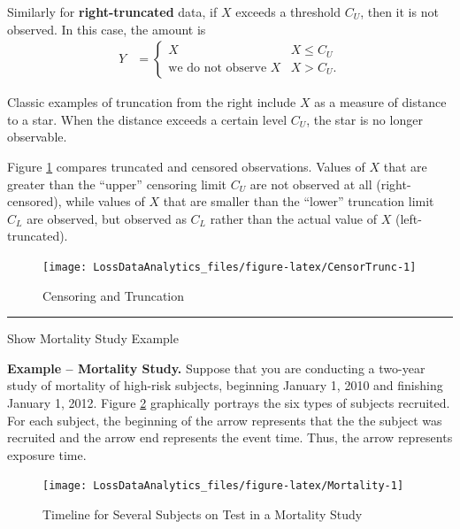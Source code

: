 \documentclass[]{book}
\theoremstyle{definition}
\theoremstyle{definition}
\theoremstyle{definition}
\theoremstyle{remark}
\begin{document}
Similarly for \textbf{right-truncated} data, if \(X\) exceeds a
threshold \(C_U\), then it is not observed. In this case, the amount is
\[
\begin{aligned}
Y &=
\left\{
\begin{array}{cl}
X & X \leq C_U \\
\text{we do not observe }X & X > C_U.
\end{array}
\right.\end{aligned}
\]

Classic examples of truncation from the right include \(X\) as a measure
of distance to a star. When the distance exceeds a certain level
\(C_U\), the star is no longer observable.

Figure \ref{fig:CensorTrunc} compares truncated and censored
observations. Values of \(X\) that are greater than the ``upper''
censoring limit \(C_U\) are not observed at all (right-censored), while
values of \(X\) that are smaller than the ``lower'' truncation limit
\(C_L\) are observed, but observed as \(C_L\) rather than the actual
value of \(X\) (left-truncated).

\begin{figure}

{\centering \texttt{[image: LossDataAnalytics\_files/figure-latex/CensorTrunc-1]} 

}

\caption{Censoring and Truncation}\label{fig:CensorTrunc}
\end{figure}

\begin{center}\rule{0.5\linewidth}{\linethickness}\end{center}

Show Mortality Study Example

\hypertarget{toggleExampleMort}{}
\textbf{Example -- Mortality Study.} Suppose that you are conducting a
two-year study of mortality of high-risk subjects, beginning January 1,
2010 and finishing January 1, 2012. Figure \ref{fig:Mortality}
graphically portrays the six types of subjects recruited. For each
subject, the beginning of the arrow represents that the the subject was
recruited and the arrow end represents the event time. Thus, the arrow
represents exposure time.

\begin{figure}

{\centering \texttt{[image: LossDataAnalytics\_files/figure-latex/Mortality-1]} 

}

\caption{Timeline for Several Subjects on Test in a Mortality Study}\label{fig:Mortality}
\end{figure}
\end{document}
